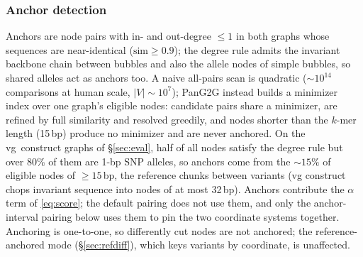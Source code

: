 \subsubsection{Anchor detection}
Anchors are node pairs with in- and out-degree $\le 1$ in both graphs whose sequences are near-identical ($\mathrm{sim}\ge0.9$); the degree rule admits the invariant backbone chain between bubbles and also the allele nodes of simple bubbles, so shared alleles act as anchors too. A naive all-pairs scan is quadratic (${\sim}10^{14}$ comparisons at human scale, $|V|\sim10^7$); PanG2G instead builds a minimizer index \cite{li2018minimap2} over one graph's eligible nodes: candidate pairs share a minimizer, are refined by full similarity and resolved greedily, and nodes shorter than the $k$-mer length (15\,bp) produce no minimizer and are never anchored. On the vg~construct graphs of \S\ref{sec:eval}, half of all nodes satisfy the degree rule but over 80\% of them are 1-bp SNP alleles, so anchors come from the ${\sim}15\%$ of eligible nodes of ${\ge}15$\,bp, the reference chunks between variants (vg construct chops invariant sequence into nodes of at most 32\,bp). Anchors contribute the $\alpha$ term of \eqref{eq:score}; the default pairing does not use them, and only the anchor-interval pairing below uses them to pin the two coordinate systems together. Anchoring is one-to-one, so differently cut nodes are not anchored; the reference-anchored mode (\S\ref{sec:refdiff}), which keys variants by coordinate, is unaffected.

